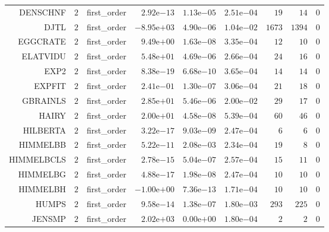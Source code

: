 \begin{longtable}{rrrrrrrrr}
DENSCHNF & \(     2\) & first\_order & \( 2.92\)e\(-13\) & \( 1.13\)e\(-05\) & \( 2.51\)e\(-04\) & \(    19\) & \(    14\) & \(     0\) \\
DJTL & \(     2\) & first\_order & \(-8.95\)e\(+03\) & \( 4.90\)e\(-06\) & \( 1.04\)e\(-02\) & \(  1673\) & \(  1394\) & \(     0\) \\
EGGCRATE & \(     2\) & first\_order & \( 9.49\)e\(+00\) & \( 1.63\)e\(-08\) & \( 3.35\)e\(-04\) & \(    12\) & \(    10\) & \(     0\) \\
ELATVIDU & \(     2\) & first\_order & \( 5.48\)e\(+01\) & \( 4.69\)e\(-06\) & \( 2.66\)e\(-04\) & \(    24\) & \(    16\) & \(     0\) \\
EXP2 & \(     2\) & first\_order & \( 8.38\)e\(-19\) & \( 6.68\)e\(-10\) & \( 3.65\)e\(-04\) & \(    14\) & \(    14\) & \(     0\) \\
EXPFIT & \(     2\) & first\_order & \( 2.41\)e\(-01\) & \( 1.30\)e\(-07\) & \( 3.06\)e\(-04\) & \(    21\) & \(    18\) & \(     0\) \\
GBRAINLS & \(     2\) & first\_order & \( 2.85\)e\(+01\) & \( 5.46\)e\(-06\) & \( 2.00\)e\(-02\) & \(    29\) & \(    17\) & \(     0\) \\
HAIRY & \(     2\) & first\_order & \( 2.00\)e\(+01\) & \( 4.58\)e\(-08\) & \( 5.39\)e\(-04\) & \(    60\) & \(    46\) & \(     0\) \\
HILBERTA & \(     2\) & first\_order & \( 3.22\)e\(-17\) & \( 9.03\)e\(-09\) & \( 2.47\)e\(-04\) & \(     6\) & \(     6\) & \(     0\) \\
HIMMELBB & \(     2\) & first\_order & \( 5.22\)e\(-11\) & \( 2.08\)e\(-03\) & \( 2.34\)e\(-04\) & \(    19\) & \(     8\) & \(     0\) \\
HIMMELBCLS & \(     2\) & first\_order & \( 2.78\)e\(-15\) & \( 5.04\)e\(-07\) & \( 2.57\)e\(-04\) & \(    15\) & \(    11\) & \(     0\) \\
HIMMELBG & \(     2\) & first\_order & \( 4.88\)e\(-17\) & \( 1.98\)e\(-08\) & \( 2.47\)e\(-04\) & \(    10\) & \(    10\) & \(     0\) \\
HIMMELBH & \(     2\) & first\_order & \(-1.00\)e\(+00\) & \( 7.36\)e\(-13\) & \( 1.71\)e\(-04\) & \(    10\) & \(    10\) & \(     0\) \\
HUMPS & \(     2\) & first\_order & \( 9.58\)e\(-14\) & \( 1.38\)e\(-07\) & \( 1.80\)e\(-03\) & \(   293\) & \(   225\) & \(     0\) \\
JENSMP & \(     2\) & first\_order & \( 2.02\)e\(+03\) & \( 0.00\)e\(+00\) & \( 1.80\)e\(-04\) & \(     2\) & \(     2\) & \(     0\) \\

\end{longtable}
